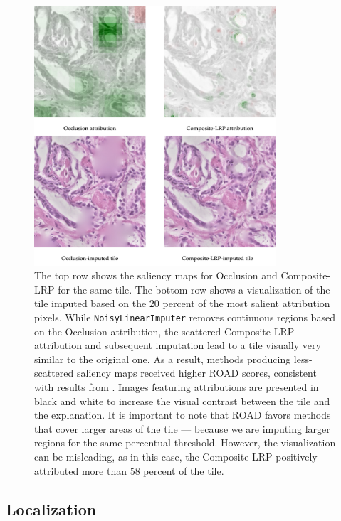 \begin{figure}
    \centering
    \includegraphics[width=0.8\textwidth]{img/road-impute.png}
    \caption{
    The top row shows the saliency maps for Occlusion and Composite-LRP for the same tile.
    The bottom row shows a visualization of the tile imputed based on the $20$ percent of the most salient attribution pixels.
    While \texttt{NoisyLinearImputer} removes continuous regions based on the Occlusion attribution, the scattered Composite-LRP attribution and subsequent imputation lead to a tile visually very similar to the original one.
    As a result, methods producing less-scattered saliency maps received higher ROAD scores, consistent with results from \cite{gallo}.
    Images featuring attributions are presented in black and white to increase the visual contrast between the tile and the explanation.
    It is important to note that ROAD favors methods that cover larger areas of the tile --- because we are imputing larger regions for the same percentual threshold.
    However, the visualization can be misleading, as in this case, the Composite-LRP positively attributed more than $58$ percent of the tile.
    }
    \label{fig:road-impute}
\end{figure}

\subsection*{Localization}

